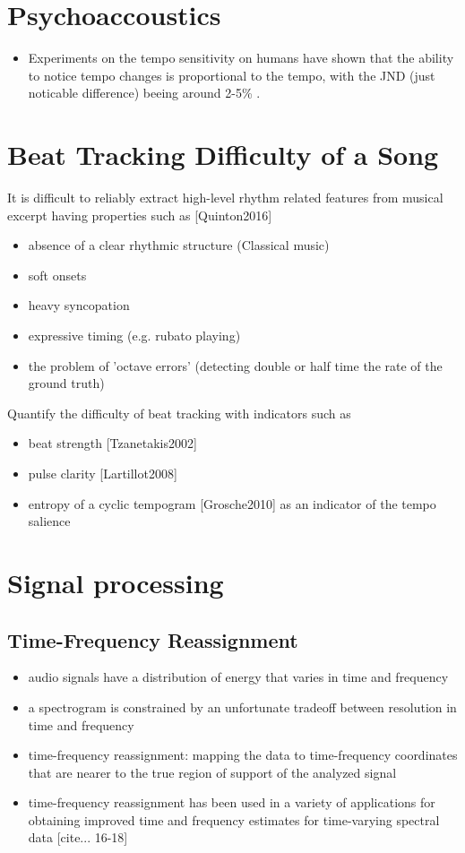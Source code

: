 \documentclass{article}
\begin{document}
\section{Psychoaccoustics}

\begin{itemize}
\item Experiments on the tempo sensitivity on humans have shown that the ability to notice tempo changes is proportional to the tempo, with the JND (just noticable difference) beeing around 2-5\% \cite{Drake1993}.
\end{itemize}


\section{Beat Tracking Difficulty of a Song}
It is difficult to reliably extract high-level rhythm related features from musical excerpt having properties such as [Quinton2016]
\begin{itemize}
\item absence of a clear rhythmic structure (Classical music)
\item soft onsets
\item heavy syncopation
\item expressive timing (e.g. rubato playing)
\item the problem of 'octave errors' (detecting double or half time the rate of the ground truth)
\end{itemize}
\vspace{1em}
Quantify the difficulty of beat tracking with indicators such as
\begin{itemize}
\item beat strength [Tzanetakis2002]
\item pulse clarity [Lartillot2008]
\item entropy of a cyclic tempogram [Grosche2010] as an indicator of the tempo salience  
\end{itemize}

\section{Signal processing}

\subsection{Time-Frequency Reassignment}
\begin{itemize}
\item audio signals have a distribution of energy that varies in time and frequency
\item a spectrogram is constrained by an unfortunate tradeoff between resolution in time and frequency
\item time-frequency reassignment: mapping the data to time-frequency coordinates that are nearer to the true region of support of the analyzed signal
\item time-frequency reassignment has been used in a variety of applications for obtaining improved time and frequency estimates for time-varying spectral data [cite... 16-18]
\end{itemize}
\end{document}
